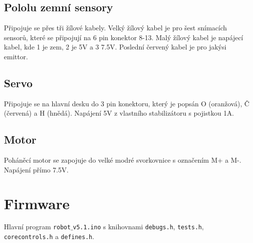 \documentclass[11pt]{article}
\begin{document}
\subsection{Pololu zemní sensory}
Připojuje se přes tři žílové kabely. Velký žílový kabel je pro šest snímacích sensorů, které se připojují na 6 pin konektor 8-13. Malý žílový kabel je napájecí kabel, kde 1 je zem, 2 je 5V a 3 7.5V. Poslední červený kabel je pro jakýsi emittor.
\subsection{Servo}
Připojuje se na hlavní desku do 3 pin konektoru, který je popsán O (oranžová), Č (červená) a H (hnědá). Napájení 5V z vlastního stabilizátoru s pojistkou 1A.
\subsection{Motor}
Poháněcí motor se zapojuje do velké modré svorkovnice s označením M+ a M-. Napájení přímo 7.5V.

\section{Firmware}
Hlavní program \texttt{robot$\_$v5.1.ino} s knihovnami \texttt{debugs.h}, \texttt{tests.h}, \texttt{corecontrols.h} a \texttt{defines.h}.  
\end{document}
